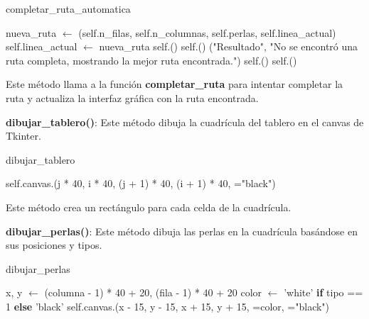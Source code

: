 \documentclass{article}
\begin{document}
\begin{algorithm}[H]
\caption{completar\_ruta\_automatica}
\begin{algorithmic}[1]
    \State nueva\_ruta $\leftarrow$ (self.n\_filas, self.n\_columnas, self.perlas, self.linea\_actual)
        \State self.linea\_actual $\leftarrow$ nueva\_ruta
        \State self.()
        \State self.()
    \Else
        \State {}("Resultado", "No se encontró una ruta completa, mostrando la mejor ruta encontrada.")
        \State self.()
        \State self.()
    \EndIf
\EndProcedure
\end{algorithmic}
\end{algorithm}

Este método llama a la función \textbf{completar\_ruta} para intentar completar la ruta y actualiza la interfaz gráfica con la ruta encontrada.

\textbf{dibujar\_tablero()}: Este método dibuja la cuadrícula del tablero en el canvas de Tkinter.

\begin{algorithm}[H]
\caption{dibujar\_tablero}
\begin{algorithmic}[1]
            \State self.canvas.(j * 40, i * 40, (j + 1) * 40, (i + 1) * 40, ="black")
    \EndFor
\EndFor
\EndProcedure
\end{algorithmic}
\end{algorithm}

Este método crea un rectángulo para cada celda de la cuadrícula.

\textbf{dibujar\_perlas()}: Este método dibuja las perlas en la cuadrícula basándose en sus posiciones y tipos.

\begin{algorithm}[H]
\caption{dibujar\_perlas}
\begin{algorithmic}[1]
        \State x, y $\leftarrow$ (columna - 1) * 40 + 20, (fila - 1) * 40 + 20
        \State color $\leftarrow$ 'white' \textbf{if} tipo == 1 \textbf{else} 'black'
        \State self.canvas.(x - 15, y - 15, x + 15, y + 15, =color, ="black")
    \EndFor
\EndProcedure
\end{algorithmic}
\end{algorithm}
\end{document}

